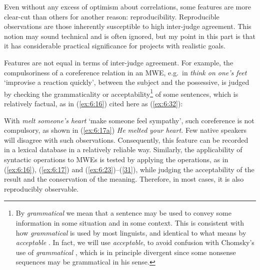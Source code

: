 \documentclass[output=paper]{langsci/langscibook}
\begin{document}
Even without any excess of optimism about correlations, some features are more clear-cut than others for another reason: reproducibility. Reproducible observations are those inherently susceptible to high inter-judge agreement. This notion may sound technical and is often ignored, but my point in this part is that it has considerable practical significance for projects with realistic goals.

Features are not equal in terms of inter-judge agreement. For example, the compulsoriness of a coreference relation in an MWE, e.g.~in \textit{think on one’s feet} ‘improvise a reaction quickly’, between the subject and the possessive, is judged by checking the grammaticality or acceptability\footnote{By \textit{grammatical} we mean that a sentence may be used to convey some information in some situation and in some context. This is consistent with how \textit{grammatical} is used by most linguists, and identical to what \citet[293]{Harris1957} means by \textit{acceptable} \citep[161]{Ross1979}. In fact, we will use \textit{acceptable}, to avoid confusion with Chomsky’s  use of \textit{grammatical} \citep[15]{Chomsky1957}, which is in principle divergent since some nonsense sequences may be grammatical in his sense.}  of some sentences, which is relatively factual, as in (\ref{ex:6:16}) cited here as (\ref{ex:6:32}):

\begin{exe}
\ex \label{ex:6:32} 
\begin{xlist}
\end{xlist}
\end{exe}


\noindent With \textit{melt someone’s heart} ‘make someone feel sympathy’, such coreference is not compulsory, as shown in (\ref{ex:6:17a}) \textit{He} \textit{melted}\textit{ your heart.} Few native speakers will disagree with such observations. Consequently, this feature can be recorded in a lexical database in a relatively reliable way. 
Similarly, the applicability of syntactic operations to MWEs is tested by applying the operations, as in (\ref{ex:6:16}), (\ref{ex:6:17}) and (\ref{ex:6:23})–(\ref{31}), while judging the acceptability of the result and the conservation of the meaning. Therefore, in most cases, it is also reproducibly observable.
\end{document}
